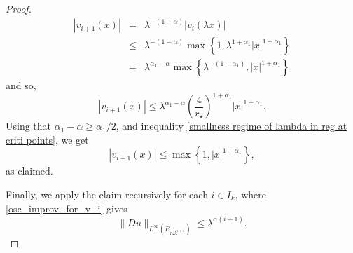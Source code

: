 \documentclass[10pt,a4paper]{amsart}
\begin{document}
\begin{proof}
\begin{eqnarray*}
|v_{i+1}(x)| & = & \lambda^{-(1+\alpha)}|v_i(\lambda x)|\\
& \leq & \lambda^{-(1+\alpha)}\max\left\{1, \lambda^{1+\alpha_1}|x|^{1+\alpha_1} \right\}\\
& = & \lambda^{\alpha_1 - \alpha}\max\left\{\lambda^{-(1+\alpha_1)} ,|x|^{1+\alpha_1} \right\}
\end{eqnarray*}
and so,
\begin{equation}\nonumber
|v_{i+1}(x)| \leq \lambda^{\alpha_1 - \alpha}\left(\frac{4}{r_\star}\right)^{1+\alpha_1} |x|^{1+\alpha_1}.
\end{equation}
Using that $\alpha_1 - \alpha \geq \alpha_1/2$, and inequality \eqref{smallness regime of lambda in reg at criti points}, we get 
$$
|v_{i+1}(x)| \leq \max\left\{1,|x|^{1+\alpha_1} \right\},
$$
as claimed.

Finally, we apply the claim recursively for each $i \in I_k$, where \eqref{osc_improv_for_v_i} gives
$$
    \|Du\|_{L^\infty\left(B_{r_\star \lambda^{i+1}}\right)} \leq \lambda^{\alpha(i+1)}.
$$
\end{proof}
\end{document}
